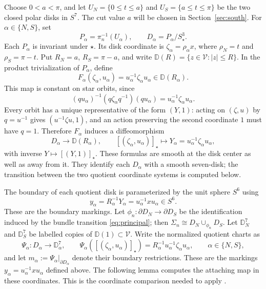 \documentclass[12pt]{amsart}
\numberwithin{equation}{section}
\theoremstyle{remark}
\begin{document}
Choose \(0<a<\pi\), and let \(U_N=\{0\le t\le a\}\) and
\(U_S=\{a\le t\le\pi\}\) be the two closed polar disks in
\(S^7\). The cut value \(a\) will be chosen in
Section~\ref{sec:south}. For \(\alpha\in\{N,S\}\), set
\[
 P_\alpha=\pi_n^{-1}(U_\alpha),\qquad
 D_\alpha=P_\alpha/S^3_\star.
\]
Each \(P_\alpha\) is invariant under \(\star\). Its disk coordinate
is \(\zeta_\alpha=\rho_\alpha x\), where
\(\rho_N=t\) and \(\rho_S=\pi-t\). Put
\(R_N=a\), \(R_S=\pi-a\), and write
\(\mathbb D(R)=\{z\in\mathcal V:|z|\le R\}\).
In the product trivialization of \(P_\alpha\), define
\[
 F_\alpha(\zeta_\alpha,u_\alpha)
       =u_\alpha^{-1}\zeta_\alpha u_\alpha
       \in\mathbb D(R_\alpha).
\]
This map is constant on star orbits, since
\[
 (qu_\alpha)^{-1}(q\zeta_\alpha q^{-1})(qu_\alpha)
       =u_\alpha^{-1}\zeta_\alpha u_\alpha.
\]
Every orbit has a unique representative of the form \((Y,1)\):
acting on \((\zeta,u)\) by \(q=u^{-1}\) gives
\((u^{-1}\zeta u,1)\), and an action preserving the second
coordinate \(1\) must have \(q=1\). Therefore \(F_\alpha\) induces
a diffeomorphism
\[
 D_\alpha\longrightarrow\mathbb D(R_\alpha),\qquad
 [ (\zeta_\alpha,u_\alpha) ]_\star
       \longmapsto Y_\alpha=u_\alpha^{-1}\zeta_\alpha u_\alpha,
\]
with inverse \(Y\mapsto[(Y,1)]_\star\). These formulas are smooth
at the disk center as well as away from it. They identify each
\(D_\alpha\) with a smooth seven-disk; the transition between
the two quotient coordinate systems is computed below.

The boundary of each quotient disk is parameterized by the unit
sphere \(S^6\) using
\[
 y_\alpha=R_\alpha^{-1}Y_\alpha
          =u_\alpha^{-1}xu_\alpha\in S^6.
\]
These are the boundary markings. Let
\(\phi_n:\partial D_N\to\partial D_S\) be the identification
induced by the bundle transition \eqref{eq:principal}; then
\(\Sigma_n\cong D_N\cup_{\phi_n}D_S\).
Let \(\mathbb D_N^7\) and \(\mathbb D_S^7\) be labelled copies of
\(\mathbb D(1)\subset\mathcal V\). Write the normalized quotient
charts as
\[
 \Psi_\alpha:D_\alpha\longrightarrow\mathbb D_\alpha^7,
 \qquad
 \Psi_\alpha([ (\zeta_\alpha,u_\alpha) ]_\star)
       =R_\alpha^{-1}u_\alpha^{-1}\zeta_\alpha u_\alpha,
 \qquad \alpha\in\{N,S\},
\]
and let \(m_\alpha:=\Psi_\alpha|_{\partial D_\alpha}\) denote their
boundary restrictions. These are the markings
\(y_\alpha=u_\alpha^{-1}xu_\alpha\) defined above.
The following lemma computes the attaching map in these coordinates.
This is the coordinate comparison needed to apply
\cite[Theorem~1 and its proof in Section~4]{DPR}.
\end{document}

